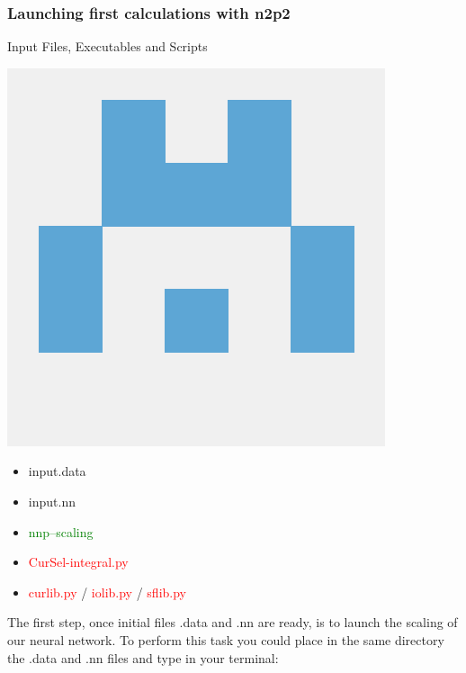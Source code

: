 \documentclass[12pt]{article}
\begin{document}
\subsubsection{Launching first calculations with n2p2}
\begin{mybox2}{{Input Files, Executables and Scripts}}
\begin{minipage}[c]{0.5\linewidth}
\includegraphics[scale=0.1]{n2p2.png}
\end{minipage}
\begin{minipage}[c]{0.5\linewidth}
\begin{itemize}
    \item input.data
    \item input.nn
    \item \textcolor{green}{nnp--scaling}
    \item \textcolor{red}{CurSel-integral.py}
    \item \textcolor{red}{curlib.py} / \textcolor{red}{iolib.py} / \textcolor{red}{sflib.py}
\end{itemize}
\end{minipage}
\end{mybox2}
The first step, once initial files .data and .nn are ready, is to launch the scaling of our neural network. To perform this task you could place in the same directory the .data and .nn files and type in your terminal:
\begin{center}
\end{center}
\end{document}
